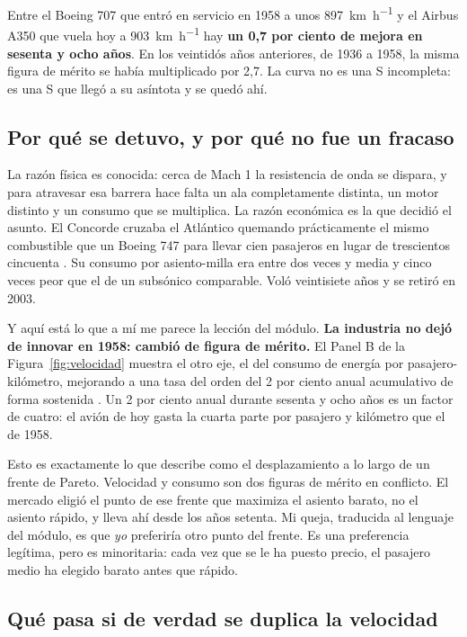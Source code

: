 \documentclass[11pt,letterpaper]{article}
\begin{document}
Entre el Boeing 707 que entró en servicio en 1958 a unos
\SI{897}{\kilo\meter\per\hour} y el Airbus A350 que vuela hoy a
\SI{903}{\kilo\meter\per\hour} hay \textbf{un 0,7 por ciento de mejora en
sesenta y ocho años}. En los veintidós años anteriores, de 1936 a 1958, la
misma figura de mérito se había multiplicado por 2,7. La curva no es una S
incompleta: es una S que llegó a su asíntota y se quedó ahí.

\subsection{Por qué se detuvo, y por qué no fue un fracaso}

La razón física es conocida: cerca de Mach 1 la resistencia de onda se dispara,
y para atravesar esa barrera hace falta un ala completamente distinta, un motor
distinto y un consumo que se multiplica. La razón económica es la que decidió
el asunto. El Concorde cruzaba el Atlántico quemando prácticamente el mismo
combustible que un Boeing 747 para llevar cien pasajeros en lugar de
trescientos cincuenta \parencite{wikiconcorde}. Su consumo por asiento-milla
era entre dos veces y media y cinco veces peor que el de un subsónico
comparable. Voló veintisiete años y se retiró en 2003.

Y aquí está lo que a mí me parece la lección del módulo. \textbf{La industria
no dejó de innovar en 1958: cambió de figura de mérito.} El Panel B de la
Figura~\ref{fig:velocidad} muestra el otro eje, el del consumo de energía por
pasajero-kilómetro, mejorando a una tasa del orden del 2 por ciento anual
acumulativo de forma sostenida \parencite{iata2026eficiencia,peeters2005}. Un 2
por ciento anual durante sesenta y ocho años es un factor de cuatro: el avión
de hoy gasta la cuarta parte por pasajero y kilómetro que el de 1958.

Esto es exactamente lo que \textcite{deweck2022} describe como el
desplazamiento a lo largo de un frente de Pareto. Velocidad y consumo son dos
figuras de mérito en conflicto. El mercado eligió el punto de ese frente que
maximiza el asiento barato, no el asiento rápido, y lleva ahí desde los años
setenta. Mi queja, traducida al lenguaje del módulo, es que \emph{yo} preferiría
otro punto del frente. Es una preferencia legítima, pero es minoritaria: cada
vez que se le ha puesto precio, el pasajero medio ha elegido barato antes que
rápido.

\subsection{Qué pasa si de verdad se duplica la velocidad}
\end{document}
